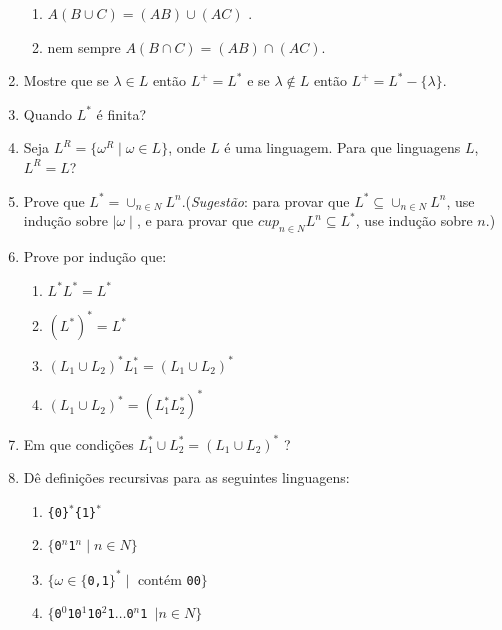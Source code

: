 \documentclass[a4paper,12pt]{article}
\begin{document}
\begin{enumerate}
		\begin{enumerate}
		\item $ A ( B \cup C ) = (AB) \cup (AC) $ . 
		\item  nem sempre $ A (B \cap C) = (AB) \cap (AC) $.
		\end{enumerate}
	\item Mostre que se $\lambda \in L$ então $L^{+} = L^{\ast}$ e se $ \lambda \notin L$ então $ L^{+} = L^{\ast} - \{ \lambda \} $.
	\item Quando $L^{\ast}$ é finita?
	\item Seja $ L^{R} = \{ \omega^{R} \mid \omega \in L\}$, onde $L$ é uma linguagem. Para que linguagens $L$, $L^{R} = L$?    
	\item Prove que $L^{\ast}  = \cup_{n \in N} L^{n}$.(\textit{Sugestão}: para provar que $L^{\ast} \subseteq \cup_{n \in N} L^{n}$, use indução sobre $\mid \omega \mid$, e para provar que $ cup_{n \in N} L^{n} \subseteq L^{\ast} $, use indução sobre $n$.) 
	\item Prove por indução que:
		\begin{enumerate}
                \item $L^{\ast}L^{\ast}=L^{\ast}$ 
                \item $(L^{\ast})^{\ast}=L^{\ast}$
		\item $(L_{1}\cup L_{2})^{\ast} L_{1}^{\ast} = ( L_{1}\cup L_{2})^{\ast}$
                \item $(L_{1}\cup L_{2})^{\ast} = ( L_{1}^{\ast}L_{2}^{\ast})^{\ast}$
		\end{enumerate}
	\item Em que condições $L_{1}^{\ast} \cup L_{2}^{\ast} = ( L_{1} \cup L_{2})^{\ast}$ ?
	\item Dê definições recursivas para as seguintes linguagens:
               \begin{enumerate}
		\item\texttt{\{0\}$^{\ast}$\{1\}$^{\ast}$}
		\item\texttt{$\{$0$^{n}$1$^{n} \mid n \in N \}$} 
		\item\texttt{$\{ \omega \in \{$0,1$\}^{\ast} \mid$} contém \texttt{00$\}$} 	
		\item\texttt{$\{$0$^{0}$10$^{1}$10$^{2}$1$\ldots$0$^{n}$1 $ \mid n \in N \}$ }
		\end{enumerate}
\end{enumerate}
\end{document}
